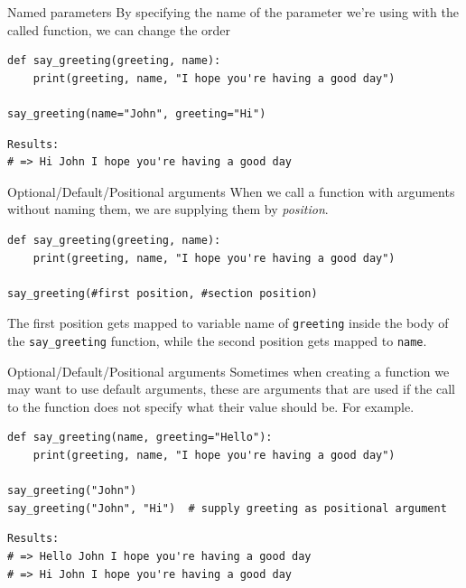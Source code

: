 \documentclass[10pt]{beamer}
\begin{document}
\begin{frame}[label={sec:org891bd87},fragile]{Named parameters}
 By specifying the name of the parameter we're using with the called function, we can
change the order

\begin{verbatim}
def say_greeting(greeting, name):
    print(greeting, name, "I hope you're having a good day")

say_greeting(name="John", greeting="Hi")
\end{verbatim}

\begin{verbatim}
Results: 
# => Hi John I hope you're having a good day
\end{verbatim}
\end{frame}

\begin{frame}[label={sec:orgcae9136},fragile]{Optional/Default/Positional arguments}
 When we call a function with arguments without naming them, we are supplying them by
\emph{position}.

\begin{verbatim}
def say_greeting(greeting, name):
    print(greeting, name, "I hope you're having a good day")

say_greeting(#first position, #section position)
\end{verbatim}

The first position gets mapped to variable name of \texttt{greeting} inside the body of the
\texttt{say\_greeting} function, while the second position gets mapped to \texttt{name}. 
\end{frame}

\begin{frame}[label={sec:org2498ae1},fragile]{Optional/Default/Positional arguments}
 Sometimes when creating a function we may want to use default arguments, these are
arguments that are used if the call to the function does not specify what their value
should be. For example.

\begin{verbatim}
def say_greeting(name, greeting="Hello"):
    print(greeting, name, "I hope you're having a good day")

say_greeting("John")
say_greeting("John", "Hi")  # supply greeting as positional argument
\end{verbatim}

\begin{verbatim}
Results: 
# => Hello John I hope you're having a good day
# => Hi John I hope you're having a good day
\end{verbatim}
\end{frame}
\end{document}
